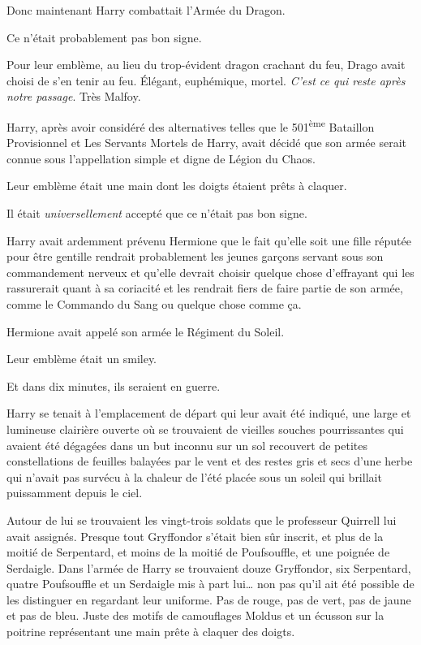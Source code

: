 Donc maintenant Harry combattait l'Armée du Dragon.

Ce n'était probablement pas bon signe.

Pour leur emblème, au lieu du trop-évident dragon crachant du feu, Drago avait choisi de s'en tenir au feu. Élégant, euphémique, mortel. \emph{C'est ce qui reste après notre passage}. Très Malfoy.

Harry, après avoir considéré des alternatives telles que le 501\textsuperscript{ème} Bataillon Provisionnel et Les Servants Mortels de Harry, avait décidé que son armée serait connue sous l'appellation simple et digne de Légion du Chaos.

Leur emblème était une main dont les doigts étaient prêts à claquer.

Il était \emph{universellement} accepté que ce n'était pas bon signe.

Harry avait ardemment prévenu Hermione que le fait qu'elle soit une fille réputée pour être gentille rendrait probablement les jeunes garçons servant sous son commandement nerveux et qu'elle devrait choisir quelque chose d'effrayant qui les rassurerait quant à sa coriacité et les rendrait fiers de faire partie de son armée, comme le Commando du Sang ou quelque chose comme ça.

Hermione avait appelé son armée le Régiment du Soleil.

Leur emblème était un smiley.

Et dans dix minutes, ils seraient en guerre.

Harry se tenait à l'emplacement de départ qui leur avait été indiqué, une large et lumineuse clairière ouverte où se trouvaient de vieilles souches pourrissantes qui avaient été dégagées dans un but inconnu sur un sol recouvert de petites constellations de feuilles balayées par le vent et des restes gris et secs d'une herbe qui n'avait pas survécu à la chaleur de l'été placée sous un soleil qui brillait puissamment depuis le ciel.

Autour de lui se trouvaient les vingt-trois soldats que le professeur Quirrell lui avait assignés. Presque tout Gryffondor s'était bien sûr inscrit, et plus de la moitié de Serpentard, et moins de la moitié de Poufsouffle, et une poignée de Serdaigle. Dans l'armée de Harry se trouvaient douze Gryffondor, six Serpentard, quatre Poufsouffle et un Serdaigle mis à part lui… non pas qu'il ait été possible de les distinguer en regardant leur uniforme. Pas de rouge, pas de vert, pas de jaune et pas de bleu. Juste des motifs de camouflages Moldus et un écusson sur la poitrine représentant une main prête à claquer des doigts.

